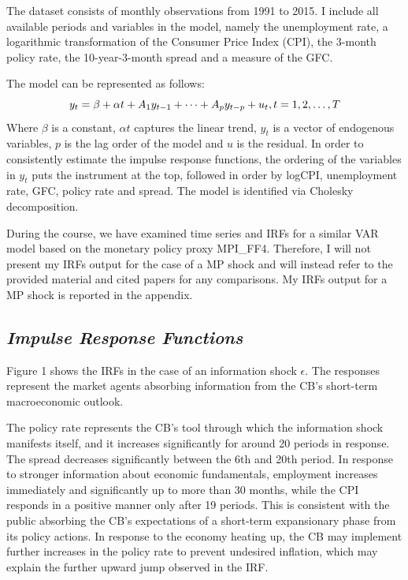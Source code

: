 \documentclass[11pt,a4paper]{article}
\begin{document}
The dataset consists of monthly observations from 1991 to 2015. I include all available periods and variables in the model, namely the unemployment rate, a logarithmic transformation of the Consumer Price Index (CPI), the 3-month policy rate, the 10-year-3-month spread and a measure of the GFC.

The model can be represented as follows:
$$
y_t = \beta + \alpha t + A_1 y_{t-1}+\dots + A_p y_{t-p} + u_t ,
\space t=1,2,\dots, T
$$
Where $\beta$ is a constant, $\alpha t$ captures the linear trend, $y_t$ is a vector of endogenous variables, $p$ is the lag order of the model and $u$ is the residual. In order to consistently estimate the impulse response functions, the ordering of the variables in $y_t$ puts the instrument at the top, followed in order by logCPI, unemployment rate, GFC, policy rate and spread. The model is identified via Cholesky decomposition.

During the course, we have examined time series and IRFs for a similar VAR model based on the monetary policy proxy MPI\_FF4. Therefore, I will not present my IRFs output for the case of a MP shock and will instead refer to the provided material and cited papers for any comparisons. My IRFs output for a MP shock is reported in the appendix.





\subsection{\textit{Impulse Response Functions}}
Figure 1 shows the IRFs in the case of an information shock $\epsilon$. The responses represent the market agents absorbing information from the CB's short-term macroeconomic outlook.

The policy rate represents the CB's tool through which the information shock manifests itself, and it increases significantly for around 20 periods in response. The spread decreases significantly between the 6th and 20th period.
In response to stronger information about economic fundamentals, employment increases immediately and significantly up to more than 30 months, while the CPI responds in a positive manner only after 19 periods. This is consistent with the public absorbing the CB's expectations of a short-term expansionary phase from its policy actions. 
In response to the economy heating up, the CB may implement further increases in the policy rate to prevent undesired inflation, which may explain the further upward jump observed in the IRF.
\end{document}
